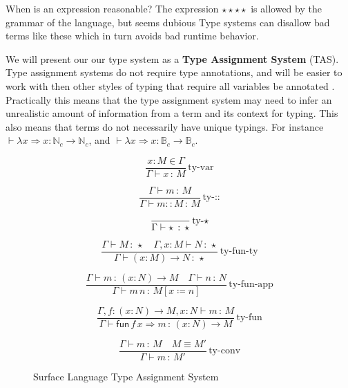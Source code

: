 When is an expression reasonable? The expression $\star\star\star\star$ is allowed by the grammar of the language, but seems dubious%
Type systems can disallow bad terms like these which in turn avoids bad runtime behavior.

We will present our our type system as a \textbf{Type Assignment System} (TAS).
Type assignment systems do not require type annotations, and will be easier to work with then other styles of typing that require all variables be annotated  .
Practically this means that the type assignment system may need to infer an unrealistic amount of information from a term and its context for typing.
This also means that terms do not necessarily have unique typings.
For instance $\vdash\lambda x\Rightarrow x:\mathbb{N}_{c}\rightarrow\mathbb{N}_{c}$, and $\vdash\lambda x\Rightarrow x:\mathbb{B}_{c}\rightarrow\mathbb{B}_{c}$.




\begin{figure}
\[
\frac{x:M\in\Gamma}{\Gamma\vdash x\,:\,M}\,\textrm{ty-var}
\]

\[
\frac{\Gamma\vdash m\,:\,M}{\Gamma\vdash m::M\,:\,M}\,\textrm{ty-::}
\]

\[
\frac{{\color{gray}\ }}{\Gamma\vdash\star\,:\,\star}\,\textrm{ty-}\star
\]

\[
\frac{\Gamma\vdash M\,:\,\star\quad\Gamma,x:M\vdash N\,:\,\star}{\Gamma\vdash\left(x:M\right)\rightarrow N\,:\,\star}\,\textrm{ty-fun-ty}
\]

\[
\frac{\Gamma\vdash m\,:\,\left(x:N\right)\rightarrow M\quad\Gamma\vdash n\,:\,N}{\Gamma\vdash m\,n\,:\,M\left[x\coloneqq n\right]}\,\textrm{ty-fun-app}
\]

\[
\frac{\Gamma,f:\left(x:N\right)\rightarrow M,x:N\vdash m\,:\,M}{\Gamma\vdash\mathsf{fun}\,f\,x\Rightarrow m\,:\,\left(x:N\right)\rightarrow M}\,\textrm{ty-fun}
\]

\[
\frac{\Gamma\vdash m\,:\,M\quad M\equiv M'}{\Gamma\vdash m\,:\,M'}\,\textrm{ty-conv}
\]



\caption{Surface Language Type Assignment System}
\label{fig:surface-TAS}
\end{figure}

